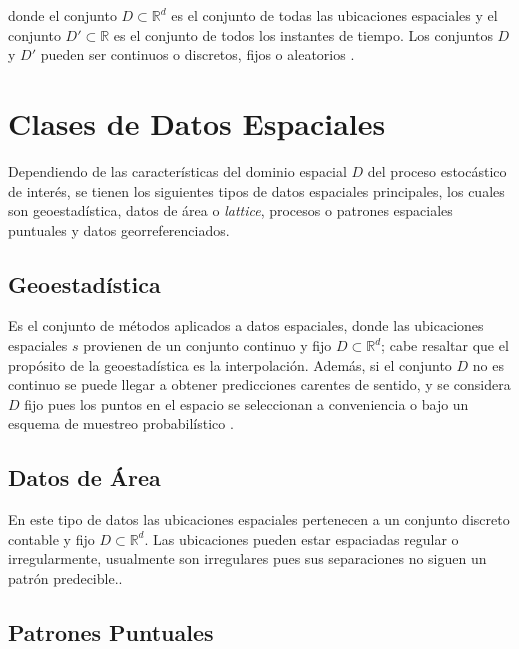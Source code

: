 \documentclass[
]{book}
\begin{document}
donde el conjunto \(D \subset \mathbb{R}^d\) es el conjunto de todas las ubicaciones espaciales y el conjunto \(D' \subset \mathbb{R}\) es el conjunto de todos los instantes de tiempo. Los conjuntos \(D\) y \(D'\) pueden ser continuos o discretos, fijos o aleatorios \citep{marta}.

\hypertarget{clases-de-datos-espaciales}{%
\section{Clases de Datos Espaciales}\label{clases-de-datos-espaciales}}

Dependiendo de las características del dominio espacial \(D\) del proceso estocástico de interés, se tienen los siguientes tipos de datos espaciales principales, los cuales son geoestadística, datos de área o \textit{lattice}, procesos o patrones espaciales puntuales y datos georreferenciados.

\hypertarget{geoestaduxedstica}{%
\subsection{Geoestadística}\label{geoestaduxedstica}}

Es el conjunto de métodos aplicados a datos espaciales, donde las ubicaciones espaciales \(s\) provienen de un conjunto continuo y fijo \(D \subset \mathbb{R}^d\); cabe resaltar que el propósito de la geoestadística es la interpolación. Además, si el conjunto \(D\) no es continuo se puede llegar a obtener predicciones carentes de sentido, y se considera \(D\) fijo pues los puntos en el espacio se seleccionan a conveniencia o bajo un esquema de muestreo probabilístico \citep{Ramon}.

\hypertarget{datos-de-uxe1rea}{%
\subsection{Datos de Área}\label{datos-de-uxe1rea}}

En este tipo de datos las ubicaciones espaciales pertenecen a un conjunto discreto contable y fijo \(D \subset \mathbb{R}^d\). Las ubicaciones pueden estar espaciadas regular o irregularmente, usualmente son irregulares pues sus separaciones no siguen un patrón predecible.\citep{Cressi}.

\hypertarget{patrones-puntuales}{%
\subsection{Patrones Puntuales}\label{patrones-puntuales}}
\end{document}

